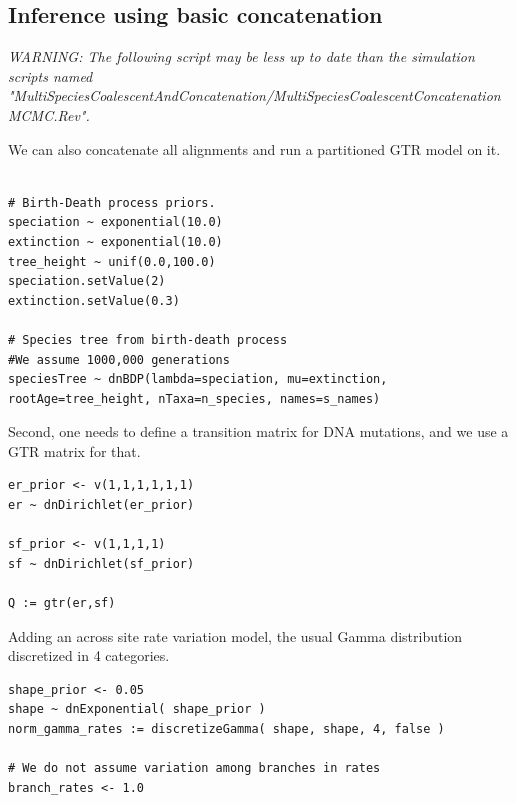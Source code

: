 \documentclass[11pt]{article}
\begin{document}
\subsection{Inference using basic concatenation }

{\begin{framed}
\begin{center}
\emph{WARNING: The following script may be less up to date than the simulation scripts named "MultiSpeciesCoalescentAndConcatenation/MultiSpeciesCoalescentConcatenationMCMC.Rev".}
\end{center}
\end{framed}}
\vspace{5mm}
We can also concatenate all alignments and run a partitioned GTR model on it.


 {\begin{framed}
 {\tt \begin{snugshade*}
\begin{lstlisting}

# Birth-Death process priors.
speciation ~ exponential(10.0)
extinction ~ exponential(10.0)
tree_height ~ unif(0.0,100.0)
speciation.setValue(2)
extinction.setValue(0.3)

# Species tree from birth-death process
#We assume 1000,000 generations
speciesTree ~ dnBDP(lambda=speciation, mu=extinction, rootAge=tree_height, nTaxa=n_species, names=s_names)
\end{lstlisting}
\end{snugshade*}}
Second, one needs to define a transition matrix for DNA mutations, and we use a GTR matrix for that.

 {\tt \begin{snugshade*}
\begin{lstlisting}
er_prior <- v(1,1,1,1,1,1)
er ~ dnDirichlet(er_prior)

sf_prior <- v(1,1,1,1)
sf ~ dnDirichlet(sf_prior)

Q := gtr(er,sf) 
\end{lstlisting}
\end{snugshade*}}

Adding an across site rate variation model, the usual Gamma distribution discretized in 4 categories.
 {\tt \begin{snugshade*}
\begin{lstlisting}
shape_prior <- 0.05 
shape ~ dnExponential( shape_prior )
norm_gamma_rates := discretizeGamma( shape, shape, 4, false )

# We do not assume variation among branches in rates
branch_rates <- 1.0


\end{lstlisting}
\end{snugshade*}}
\end{framed}}
\end{document}
